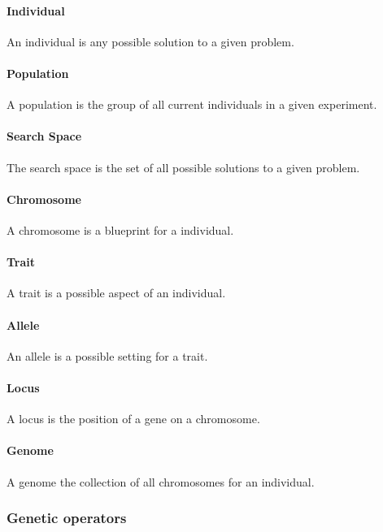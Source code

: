 \paragraph{Individual}

An individual is any possible solution to a given problem.

\paragraph{Population}

A population is the group of all current individuals in a given experiment.

\paragraph{Search Space}

The search space is the set of all possible solutions to a given problem.

\paragraph{Chromosome}

A chromosome is a blueprint for a individual.

\paragraph{Trait}

A trait is a possible aspect of an individual.

\paragraph{Allele}

An allele is a possible setting for a trait.

\paragraph{Locus}

A locus is the position of a gene on a chromosome.

\paragraph{Genome}

A genome the collection of all chromosomes for an individual.

\subsubsection{Genetic operators}

